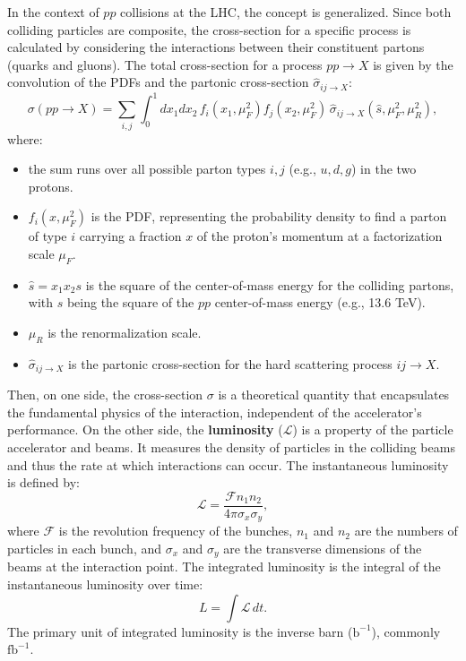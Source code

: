 In the context of $pp$ collisions at the LHC, the concept is generalized. Since both colliding particles are composite, the cross-section for a specific process is calculated by considering the interactions between their constituent partons (quarks and gluons). The total cross-section for a process $pp \to X$ is given by the convolution of the PDFs and the partonic cross-section $\hat{\sigma}_{ij \to X}$:
\begin{equation}
\sigma(pp \to X) = \sum_{i,j} \int_0^1 dx_1 dx_2\, f_i(x_1, \mu_F^2) f_j(x_2, \mu_F^2)\, \hat{\sigma}_{ij \to X}(\hat{s}, \mu_F^2, \mu_R^2),
\label{eq:cross_section}
\end{equation}
where:
\begin{itemize}
    \item the sum runs over all possible parton types $i, j$ (e.g., $u, d, g$) in the two protons.
    \item $f_i(x, \mu_F^2)$ is the PDF, representing the probability density to find a parton of type $i$ carrying a fraction $x$ of the proton's momentum at a factorization scale $\mu_F$.
		\item $\hat{s} = x_1 x_2 s$ is the square of the center-of-mass energy for the colliding partons, with $s$ being the square of the $pp$ center-of-mass energy (e.g., 13.6 TeV).
    \item $\mu_R$ is the renormalization scale.
    \item $\hat{\sigma}_{ij \to X}$ is the partonic cross-section for the hard scattering process $ij \to X$.
\end{itemize}
Then, on one side, the cross-section $\sigma$ is a theoretical quantity that encapsulates the fundamental physics of the interaction, independent of the accelerator's performance. On the other side, the \textbf{luminosity} ($\mathcal{L}$) is a property of the particle accelerator and beams. It measures the density of particles in the colliding beams and thus the rate at which interactions can occur. The instantaneous luminosity is defined by:
\begin{equation}
\mathcal{L} = \frac{\mathcal{F} n_1 n_2}{4\pi \sigma_x \sigma_y},
\end{equation}
where $\mathcal{F}$ is the revolution frequency of the bunches, $n_1$ and $n_2$ are the numbers of particles in each bunch, and $\sigma_x$ and $\sigma_y$ are the transverse dimensions of the beams at the interaction point. The integrated luminosity is the integral of the instantaneous luminosity over time:
\begin{equation}
L = \int \mathcal{L}\, dt.
\end{equation}
The primary unit of integrated luminosity is the inverse barn ($\text{b}^{-1}$), commonly $\text{fb}^{-1}$.

